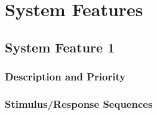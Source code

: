 \chapter{System Features} \label{chp:system-features}
	\begin{comment}
		$<$This template illustrates organizing the functional requirements for the 
		product by system features, the major services provided by the product. You may 
		prefer to organize this section by use case, mode of operation, user class, 
		object class, functional hierarchy, or combinations of these, whatever makes the 
		most logical sense for your product.$>$
	\end{comment}

\section{System Feature 1}
	\begin{comment}
		$<$Don’t really say “System Feature 1.” State the feature name in just a few 
		words.$>$
	\end{comment}

\subsection{Description and Priority}
	\begin{comment}
		$<$Provide a short description of the feature and indicate whether it is of 
		High, Medium, or Low priority. You could also include specific priority 
		component ratings, such as benefit, penalty, cost, and risk (each rated on a 
		relative scale from a low of 1 to a high of 9).$>$
	\end{comment}

\subsection{Stimulus/Response Sequences}
	\begin{comment}
		$<$List the sequences of user actions and system responses that stimulate the 
		behavior defined for this feature. These will correspond to the dialog elements 
		associated with use cases.$>$
	\end{comment}

